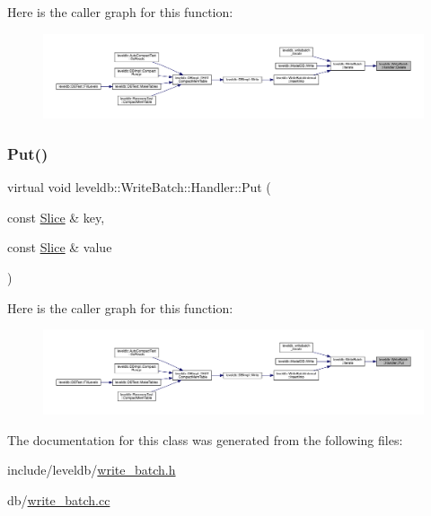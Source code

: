Here is the caller graph for this function\+:
\nopagebreak
\begin{figure}[H]
\begin{center}
\leavevmode
\includegraphics[width=350pt]{classleveldb_1_1_write_batch_1_1_handler_aeab6526b87bf5b50fb64216b69b34b17_icgraph}
\end{center}
\end{figure}
\mbox{\label{classleveldb_1_1_write_batch_1_1_handler_ad41d4985db289b94e29921167d206d4b}} 
\subsubsection{\texorpdfstring{Put()}{Put()}}
{\footnotesize\ttfamily virtual void leveldb\+::\+Write\+Batch\+::\+Handler\+::\+Put (\begin{DoxyParamCaption}\item[{const \mbox{\hyperlink{classleveldb_1_1_slice}{Slice}} \&}]{key,  }\item[{const \mbox{\hyperlink{classleveldb_1_1_slice}{Slice}} \&}]{value }\end{DoxyParamCaption})\hspace{0.3cm}{\ttfamily [pure virtual]}}

Here is the caller graph for this function\+:
\nopagebreak
\begin{figure}[H]
\begin{center}
\leavevmode
\includegraphics[width=350pt]{classleveldb_1_1_write_batch_1_1_handler_ad41d4985db289b94e29921167d206d4b_icgraph}
\end{center}
\end{figure}


The documentation for this class was generated from the following files\+:\begin{DoxyCompactItemize}
\item 
include/leveldb/\mbox{\hyperlink{write__batch_8h}{write\+\_\+batch.\+h}}\item 
db/\mbox{\hyperlink{write__batch_8cc}{write\+\_\+batch.\+cc}}\end{DoxyCompactItemize}
